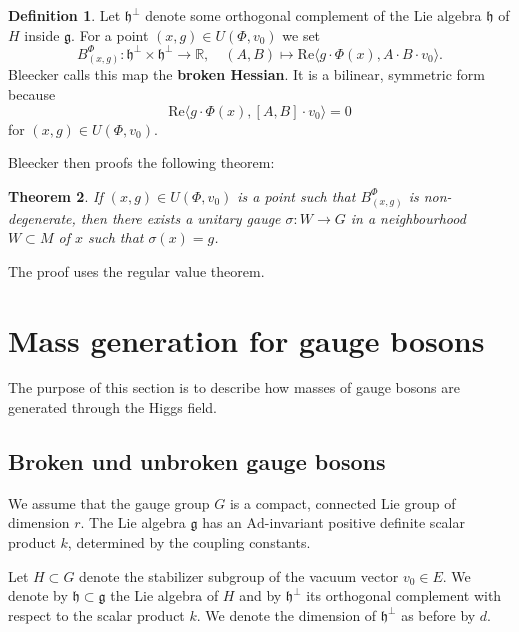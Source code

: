\documentclass[12pt]{amsart}
\newtheorem{thm}{Theorem}[section]
\theoremstyle{definition}
\newtheorem{defn}[thm]{Definition}
\theoremstyle{remark}
\numberwithin{equation}{section}
\begin{document}
\begin{defn}Let $\mathfrak{h}^\perp$ denote some orthogonal complement of the Lie algebra $\mathfrak{h}$ of $H$ inside $\mathfrak{g}$. For a point $(x,g)\in U(\Phi,v_0)$ we set 
\begin{equation*}
B^\Phi_{(x,g)}\colon\mathfrak{h}^\perp\times\mathfrak{h}^\perp\longrightarrow\mathbb{R},\quad (A,B)\longmapsto \mathrm{Re}\langle g\cdot\Phi(x),A\cdot B\cdot v_0\rangle.
\end{equation*} 
Bleecker calls this map the {\bf broken Hessian}. It is a bilinear, symmetric form because 
\begin{equation*}
\mathrm{Re}\langle g\cdot\Phi(x),[A,B]\cdot v_0\rangle=0
\end{equation*}
for $(x,g)\in U(\Phi,v_0)$.
\end{defn}
Bleecker then proofs the following theorem:
\begin{thm}If $(x,g)\in U(\Phi,v_0)$ is a point such that $B^\Phi_{(x,g)}$ is non-degenerate, then there exists a unitary gauge $\sigma\colon W\rightarrow G$ in a neighbourhood $W\subset M$ of $x$ such that $\sigma(x)=g$.
\end{thm}
The proof uses the regular value theorem.





\section{Mass generation for gauge bosons}\label{sect mass gen}

The purpose of this section is to describe how masses of gauge bosons are generated through the Higgs field. 

\subsection{Broken und unbroken gauge bosons}
We assume that the gauge group $G$ is a compact, connected Lie group of dimension $r$. The Lie algebra $\mathfrak{g}$ has an $\mathrm{Ad}$-invariant positive definite scalar product $k$, determined by the coupling constants.

Let $H\subset G$ denote the stabilizer subgroup of the vacuum vector $v_0\in E$. We denote by $\mathfrak{h}\subset\mathfrak{g}$ the Lie algebra of $H$ and by $\mathfrak{h}^\perp$ its orthogonal complement with respect to the scalar product $k$. We denote the dimension of $\mathfrak{h}^\perp$ as before by $d$.
\end{document}

